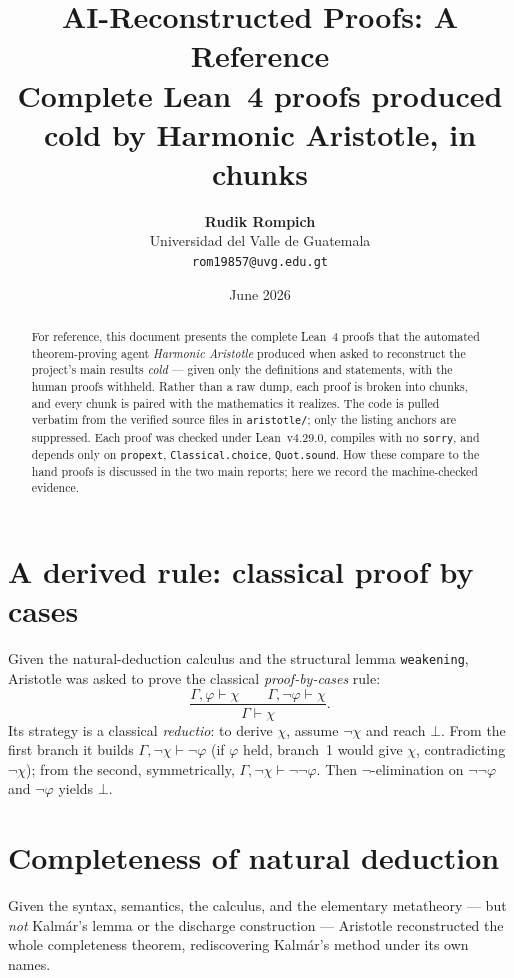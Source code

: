 \documentclass[11pt]{article}
\title{\textbf{AI-Reconstructed Proofs: A Reference}\\[2pt]
\large Complete Lean~4 proofs produced cold by Harmonic Aristotle, in chunks}
\author{\textbf{Rudik Rompich} \\ Universidad del Valle de Guatemala \\ \texttt{rom19857@uvg.edu.gt}}
\date{June 2026}
\newcommand{\Not}{\neg}
\newcommand{\Prov}{\vdash}
\begin{document}
\maketitle

\begin{abstract}
For reference, this document presents the complete Lean~4 proofs that the automated theorem-proving
agent \emph{Harmonic Aristotle} produced when asked to reconstruct the project's main results
\emph{cold} --- given only the definitions and statements, with the human proofs withheld. Rather than
a raw dump, each proof is broken into chunks, and every chunk is paired with the mathematics it
realizes. The code is pulled verbatim from the verified source files in \texttt{aristotle/}; only the
listing anchors are suppressed. Each proof was checked under Lean~v4.29.0, compiles with no
\texttt{sorry}, and depends only on \texttt{propext}, \texttt{Classical.choice}, \texttt{Quot.sound}.
How these compare to the hand proofs is discussed in the two main reports; here we record the
machine-checked evidence.
\end{abstract}

\tableofcontents
\bigskip

\section{A derived rule: classical proof by cases}
Given the natural-deduction calculus and the structural lemma \texttt{weakening}, Aristotle was asked
to prove the classical \emph{proof-by-cases} rule:
\[
  \frac{\Gamma,\varphi \Prov \chi \qquad \Gamma,\Not\varphi \Prov \chi}{\Gamma \Prov \chi}.
\]
Its strategy is a classical \emph{reductio}: to derive $\chi$, assume $\Not\chi$ and reach $\bot$.
From the first branch it builds $\Gamma,\Not\chi \Prov \Not\varphi$ (if $\varphi$ held, branch~1 would
give $\chi$, contradicting $\Not\chi$); from the second, symmetrically, $\Gamma,\Not\chi \Prov
\Not\Not\varphi$. Then $\Not$-elimination on $\Not\Not\varphi$ and $\Not\varphi$ yields $\bot$.


\section{Completeness of natural deduction}
Given the syntax, semantics, the calculus, and the elementary metatheory --- but \emph{not} Kalmár's
lemma or the discharge construction --- Aristotle reconstructed the whole completeness theorem,
rediscovering Kalmár's method under its own names.
\end{document}
